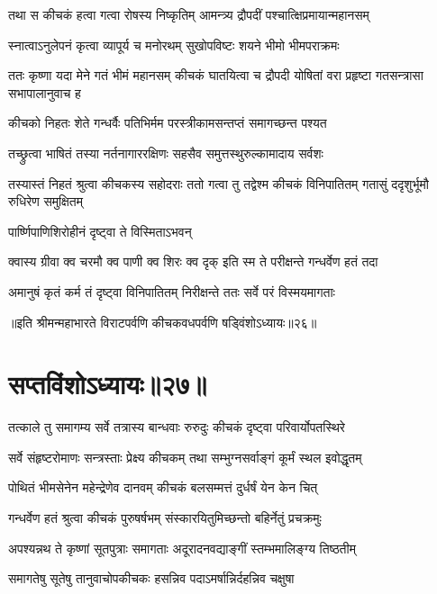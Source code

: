 \twolineshloka
{तथा स कीचकं हत्वा गत्वा रोषस्य निष्कृतिम्}
{आमन्त्र्य द्रौपदीं पश्चात्क्षिप्रमायान्महानसम्}


\twolineshloka
{स्नात्वाऽनुलेपनं कृत्वा व्यापूर्य च मनोरथम्}
{सुखोपविष्टः शयने भीमो भीमपराक्रमः}


\threelineshloka
{ततः कृष्णा यदा मेने गतं भीमं महानसम्}
{कीचकं घातयित्वा च द्रौपदी योषितां वरा}
{प्रहृष्टा गतसन्त्रासा सभापालानुवाच ह}


\twolineshloka
{कीचको निहतः शेते गन्धर्वैः पतिभिर्मम}
{परस्त्रीकामसन्तप्तं समागच्छन्त पश्यत}


\twolineshloka
{तच्छ्रुत्वा भाषितं तस्या नर्तनागाररक्षिणः}
{सहसैव समुत्तस्थुरुल्कामादाय सर्वशः}


\threelineshloka
{तस्यास्तं निहतं श्रुत्वा कीचकस्य सहोदराः}
{ततो गत्वा तु तद्वेश्म कीचकं विनिपातितम्}
{गतासुं ददृशुर्भूमौ रुधिरेण समुक्षितम्}


\onelineshloka
{पार्ष्णिपाणिशिरोहीनं दृष्ट्वा ते विस्मिताऽभवन्}

\twolineshloka
{क्वास्य ग्रीवा क्व चरमौ क्व पाणी क्व शिरः क्व दृक्}
{इति स्म ते परीक्षन्ते गन्धर्वेण हतं तदा}


\twolineshloka
{अमानुषं कृतं कर्म तं दृष्ट्वा विनिपातितम्}
{निरीक्षन्ते ततः सर्वे परं विस्मयमागताः}

॥इति श्रीमन्महाभारते विराटपर्वणि कीचकवधपर्वणि षड्विंशोऽध्यायः॥२६॥

\chapter{सप्तविंशोऽध्यायः॥२७॥}

\twolineshloka
{तत्काले तु समागम्य सर्वे तत्रास्य बान्धवाः}
{रुरुदुः कीचकं दृष्ट्वा परिवार्योपतस्थिरे}





\twolineshloka
{सर्वे संहृष्टरोमाणः सन्त्रस्ताः प्रेक्ष्य कीचकम्}
{तथा सम्भुग्नसर्वाङ्गं कूर्मं स्थल इवोद्धृतम्}


\twolineshloka
{पोथितं भीमसेनेन महेन्द्रेणेव दानवम्}
{कीचकं बलसम्मत्तं दुर्धर्षं येन केन चित्}


\twolineshloka
{गन्धर्वेण हतं श्रुत्वा कीचकं पुरुषर्षभम्}
{संस्कारयितुमिच्छन्तो बहिर्नेतुं प्रचक्रमुः}


\twolineshloka
{अपश्यन्नथ ते कृष्णां सूतपुत्राः समागताः}
{अदूरादनवद्याङ्गीं स्तम्भमालिङ्ग्य तिष्ठतीम्}


\twolineshloka
{समागतेषु सूतेषु तानुवाचोपकीचकः}
{हसन्निव पदाऽमर्षान्निर्दहन्निव चक्षुषा}


